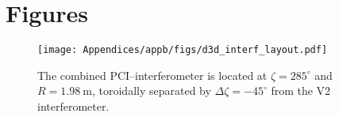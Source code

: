 \chapter{Figures}

\begin{figure}[ht]
\centering
\texttt{[image: Appendices/appb/figs/d3d\_interf\_layout.pdf]}
\caption{%
  The combined PCI--interferometer is located at
  $\zeta = 285^{\circ}$ and $R = \SI{1.98}{\meter}$,
  toroidally separated by $\Delta \zeta = -45^{\circ}$
  from the V2 interferometer.}
\label{fig:d3d_interf_layout}
\end{figure}

\clearpage
\newpage
